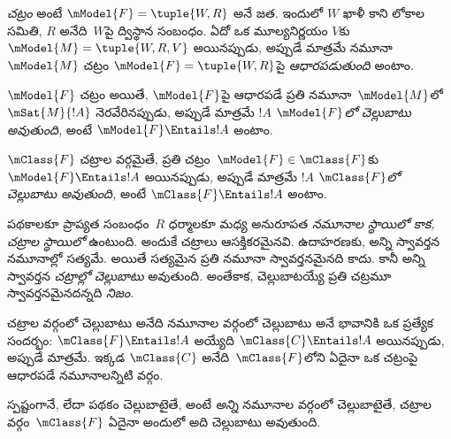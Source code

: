 \documentclass[../../../include/open-logic-section]{subfiles}
\begin{document}


\begin{defn}
  \emph{చట్రం} అంటే $\mModel{F} = \tuple{W,R}$ అనే జత.
  ఇందులో $W$ ఖాళీ కాని లోకాల సమితి, $R$
  అనేది~$W$పై ద్విస్థాన సంబంధం. ఏదో ఒక మూల్యనిర్ణయం
  $V$కు $\mModel{M} = \tuple{W, R, V}$ అయినప్పుడు, అప్పుడే మాత్రమే
  నమూనా $\mModel{M}$ చట్రం $\mModel{F} = \tuple{W,R}$పై
  \emph{ఆధారపడుతుంది} అంటాం.
\end{defn}

\begin{defn}
  $\mModel{F}$ చట్రం అయితే, $\mModel{F}$పై ఆధారపడే ప్రతి
  నమూనా~$\mModel{M}$లో $\mSat{M}{!A}$ నెరవేరినప్పుడు, అప్పుడే మాత్రమే
  $!A$ \emph{$\mModel{F}$లో చెల్లుబాటు అవుతుంది,}
  అంటే $\mModel{F} \Entails !A$ అంటాం.

  $\mClass{F}$ చట్రాల వర్గమైతే, ప్రతి చట్రం~$\mModel{F} \in \mClass{F}$కు
  $\mModel{F} \Entails !A$ అయినప్పుడు, అప్పుడే మాత్రమే $!A$
  \emph{$\mClass{F}$లో చెల్లుబాటు అవుతుంది,}
  అంటే $\mClass{F} \Entails !A$ అంటాం.
\end{defn}

పథకాలకూ ప్రాప్యత సంబంధం~$R$ ధర్మాలకూ మధ్య అనురూపత
\emph{నమూనాల స్థాయిలో కాక, చట్రాల స్థాయిలో} ఉంటుంది.
అందుకే చట్రాలు ఆసక్తికరమైనవి. ఉదాహరణకు,  అన్ని స్వావర్తన నమూనాల్లో సత్యమే.
అయితే  సత్యమైన ప్రతి నమూనా స్వావర్తనమైనది కాదు.
కానీ  అన్ని స్వావర్తన \emph{చట్రాల్లో}
\emph{చెల్లుబాటు} అవుతుంది. అంతేకాక, 
చెల్లుబాటయ్యే ప్రతి చట్రమూ స్వావర్తనమైనదన్నది
\emph{నిజం}.

\begin{rem}
చట్రాల వర్గంలో చెల్లుబాటు అనేది నమూనాల వర్గంలో
చెల్లుబాటు అనే భావానికి ఒక ప్రత్యేక సందర్భం:
$\mClass{F} \Entails !A$ అయ్యేది
$\mClass{C} \Entails !A$ అయినప్పుడు, అప్పుడే మాత్రమే. ఇక్కడ $\mClass{C}$
అనేది~$\mClass{F}$లోని ఏదైనా ఒక చట్రంపై ఆధారపడే
నమూనాలన్నిటి వర్గం.

స్పష్టంగానే,  లేదా పథకం
చెల్లుబాటైతే, అంటే \emph{అన్ని} నమూనాల వర్గంలో
చెల్లుబాటైతే, చట్రాల వర్గం~$\mClass{F}$ ఏదైనా అందులో
అది చెల్లుబాటు అవుతుంది.
\end{rem}
\end{document}
